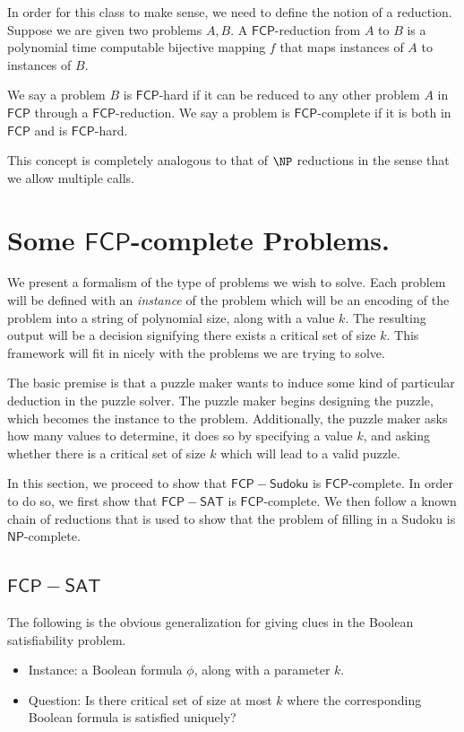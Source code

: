 \documentclass[runningheads,a4paper]{llncs}
\begin{document}
In order for this class to make sense, we need to define the notion of a reduction. Suppose we are given two problems $A, B$. A $\mathsf{FCP}$-reduction from $A$ to $B$ is a polynomial time computable bijective mapping $f$ that maps instances of $A$ to instances of $B$.  

We say a problem $B$ is $\mathsf{FCP}$-hard if it can be reduced to any other problem $A$ in $\mathsf{FCP}$ through a $\mathsf{FCP}$-reduction. We say a problem is $\mathsf{FCP}$-complete if it is both in $\mathsf{FCP}$ and is $\mathsf{FCP}$-hard. 

This concept is completely analogous to that of $\NP$ reductions in the sense that we allow multiple calls. 

\section{Some $\mathsf{FCP}$-complete Problems.}
\label{sec:The Problems}

We present a formalism of the type of problems we wish to solve. Each problem will be defined with an \emph{instance} of the problem which will be an encoding of the problem into a string of polynomial size, along with a value $k$. The resulting output will be a decision signifying there exists a critical set of size $k$. This framework will fit in nicely with the problems we are trying to solve.

The basic premise is that a puzzle maker wants to induce some kind of particular deduction in the puzzle solver. The puzzle maker begins designing the puzzle, which becomes the instance to the problem. Additionally, the puzzle maker asks how many values to determine, it does so by specifying a value $k$, and asking whether there is a critical set of size $k$ which will lead to a valid puzzle.

In this section, we proceed to show that $\mathsf{FCP-Sudoku}$ is $\mathsf{FCP}$-complete. In order to do so, we first show that $\mathsf{FCP-SAT}$ is $\mathsf{FCP}$-complete. We then follow a known chain of reductions that is used to show that the problem of filling in a Sudoku is $\mathsf{NP}$-complete. 

\subsection{$\mathsf{FCP-SAT}$}
The following is the obvious generalization for giving clues in the Boolean satisfiability problem.

\begin{itemize}
\item Instance: a Boolean formula $\phi$, along with a parameter $k$.
\item Question: Is there critical set of size at most $k$ where the corresponding Boolean formula is satisfied uniquely?
\end{itemize}
\end{document}
